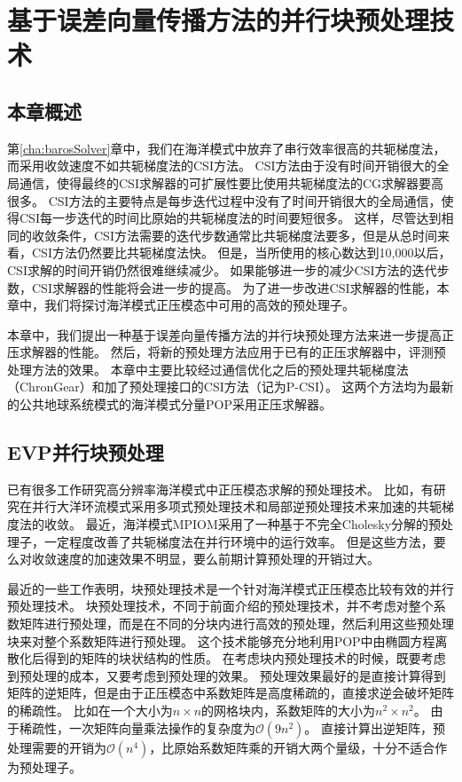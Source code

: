 \chapter{基于误差向量传播方法的并行块预处理技术}
\label{cha:precond}

\section{本章概述}

第\ref{cha:barosSolver}章中，我们在海洋模式中放弃了串行效率很高的共轭梯度法，而采用收敛速度不如共轭梯度法的CSI方法。
CSI方法由于没有时间开销很大的全局通信，使得最终的CSI求解器的可扩展性要比使用共轭梯度法的CG求解器要高很多。
CSI方法的主要特点是每步迭代过程中没有了时间开销很大的全局通信，使得CSI每一步迭代的时间比原始的共轭梯度法的时间要短很多。 
这样，尽管达到相同的收敛条件，CSI方法需要的迭代步数通常比共轭梯度法要多，但是从总时间来看，CSI方法仍然要比共轭梯度法快。
但是，当所使用的核心数达到10,000以后，CSI求解的时间开销仍然很难继续减少。 
如果能够进一步的减少CSI方法的迭代步数，CSI求解器的性能将会进一步的提高。
为了进一步改进CSI求解器的性能，本章中，我们将探讨海洋模式正压模态中可用的高效的预处理子。

本章中，我们提出一种基于误差向量传播方法的并行块预处理方法来进一步提高正压求解器的性能。
然后，将新的预处理方法应用于已有的正压求解器中，评测预处理方法的效果。
本章中主要比较经过通信优化之后的预处理共轭梯度法（ChronGear）和加了预处理接口的CSI方法（记为P-CSI）。
这两个方法均为最新的公共地球系统模式的海洋模式分量POP采用正压求解器\cite{yong2015}。 


\section{EVP并行块预处理} 
\label{precond:EVP}

已有很多工作研究高分辨率海洋模式中正压模态求解的预处理技术。 
比如，有研究在并行大洋环流模式采用多项式预处理技术和局部逆预处理技术来加速的共轭梯度法的收敛\cite{smith1992parallel}。 
最近，海洋模式MPIOM采用了一种基于不完全Cholesky分解的预处理子，一定程度改善了共轭梯度法在并行环境中的运行效率\cite{adamidis2011high}。
但是这些方法，要么对收敛速度的加速效果不明显，要么前期计算预处理的开销过大。 

最近的一些工作表明，块预处理技术是一个针对海洋模式正压模态比较有效的并行预处理技术\cite{concus1985block, white2011block}。
块预处理技术，不同于前面介绍的预处理技术，并不考虑对整个系数矩阵进行预处理，而是在不同的分块内进行高效的预处理，然后利用这些预处理块来对整个系数矩阵进行预处理。 
这个技术能够充分地利用POP中由椭圆方程离散化后得到的矩阵的块状结构的性质。
在考虑块内预处理技术的时候，既要考虑到预处理的成本，又要考虑到预处理的效果。
预处理效果最好的是直接计算得到矩阵的逆矩阵，但是由于正压模态中系数矩阵是高度稀疏的，直接求逆会破坏矩阵的稀疏性。
比如在一个大小为$n\times n$的网格块内，系数矩阵的大小为$n^2\times n^2$。
由于稀疏性，一次矩阵向量乘法操作的复杂度为$\mathcal{O}(9n^2)$。 
直接计算出逆矩阵，预处理需要的开销为$\mathcal{O}(n^4)$，比原始系数矩阵乘的开销大两个量级，十分不适合作为预处理子。

